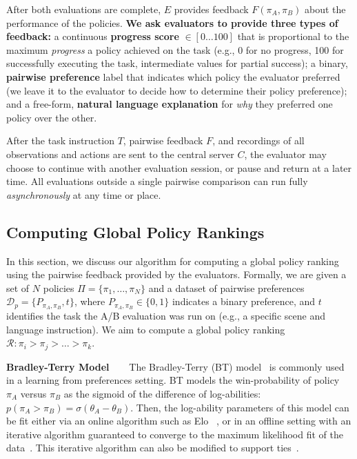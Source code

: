 After both evaluations are complete, $E$ provides feedback $F(\pi_A, \pi_B)$ about the performance of the policies. \textbf{We ask evaluators to provide three types of feedback:} a continuous \textbf{progress score} $\in [0 \dots 100]$ that is proportional to the maximum \emph{progress} a policy achieved on the task (e.g., 0 for no progress, 100 for successfully executing the task, intermediate values for partial success); a binary, \textbf{pairwise preference} label that indicates which policy the evaluator preferred (we leave it to the evaluator to decide how to determine their policy preference); and a free-form, \textbf{natural language explanation} for \emph{why} they preferred one policy over the other. 

After the task instruction $T$, pairwise feedback $F$, and recordings of all observations and actions are sent to the central server $C$, the evaluator may choose to continue with another evaluation session, or pause and return at a later time. All evaluations outside a single pairwise comparison can run fully \emph{asynchronously} at any time or place. %

\subsection{Computing Global Policy Rankings}
\label{sec:policy_ranking}
In this section, we discuss our algorithm for computing a global policy ranking using the pairwise feedback provided by the evaluators. Formally, we are given a set of $N$ policies $\Pi = \{\pi_1, \dots, \pi_N\}$ and a dataset of pairwise preferences $\mathcal{D}_p = \{P_{\pi_A, \pi_B}, t\}$, where $P_{\pi_A, \pi_B} \in \{0, 1\}$ indicates a binary preference, and $t$ identifies the task the A/B evaluation was run on (e.g., a specific scene and language instruction). We aim to compute a global policy ranking $\mathcal{R}: \pi_i > \pi_j > \dots > \pi_k$. 

\textbf{Bradley-Terry Model~~~} The Bradley-Terry (BT) model~\citep{bradley1952rank} is commonly used in a learning from preferences setting. BT models the win-probability of policy $\pi_A$ versus $\pi_B$ as the sigmoid of the difference of log-abilities: $p(\pi_A > \pi_B) = \sigma(\theta_A - \theta_B)$. Then, the log-ability parameters of this model can be fit either via an online algorithm such as Elo~\citep{elo1967proposed}%
, or in an offline setting with an iterative algorithm guaranteed to converge to the maximum likelihood fit of the data~\cite{zermelo1929berechnung}. This iterative algorithm can also be modified to support ties~\cite{davidson1970extending}. 

